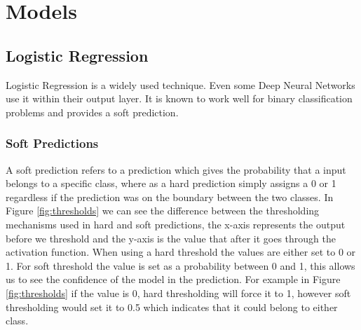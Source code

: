\section{Models}
\subsection{Logistic Regression}
Logistic Regression is a widely used technique. Even some Deep Neural Networks use it within their output layer. It is known to work well for binary classification problems and provides a soft prediction. 
\subsubsection{Soft Predictions}
A soft prediction refers to a prediction which gives the probability that a input belongs to a specific class, where as a hard prediction simply assigns a 0 or 1 regardless if the prediction was on the boundary between the two classes. In Figure \ref{fig:thresholds} we can see the difference between the thresholding mechanisms used in hard and soft predictions, the x-axis represents the output before  we threshold and the y-axis is the value that after it goes through the activation function. When using a hard threshold the values are either set to 0 or 1. For soft threshold the value is set as a probability between 0 and 1, this allows us to see the confidence of the model in the prediction. For example in Figure \ref{fig:thresholds} if the value is 0, hard thresholding will force it to 1, however soft thresholding would set it to 0.5 which indicates that it could belong to either class. 

